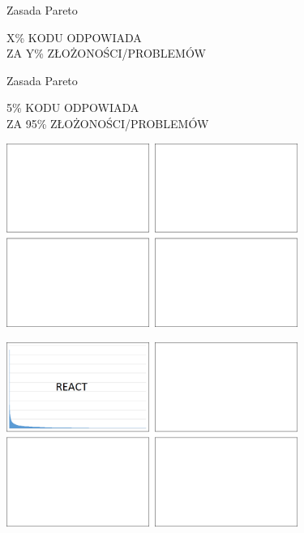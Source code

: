 \documentclass{beamer}
\begin{document}
\begin{frame}{Zasada Pareto}
\begin{center}
\Large{{\color{red}X\%} KODU ODPOWIADA\\
ZA {\color{red}Y\%} ZŁOŻONOŚCI/PROBLEMÓW}
\end{center}
\end{frame}

\begin{frame}{Zasada Pareto}
\begin{center}
\Large{{\color{red}5\%} KODU ODPOWIADA\\
ZA {\color{red}95\%} ZŁOŻONOŚCI/PROBLEMÓW}
\end{center}
\end{frame}

\begin{frame}{}
\begin{center}
  	\includegraphics[height=6cm]{git_log1.png}
\end{center}
\end{frame}

\begin{frame}{}
\begin{center}
  	\includegraphics[height=6cm]{git_log2.png}
\end{center}
\end{frame}
\end{document}
